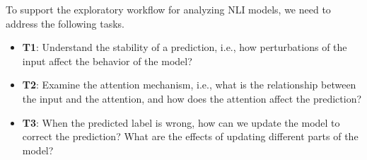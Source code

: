 %
To support the exploratory workflow for analyzing NLI models, we need to address the following tasks.

\begin{itemize}

\item \textbf{T1}: Understand the stability of a prediction, i.e., how perturbations of the input affect the behavior of the model?

\item \textbf{T2}: Examine the attention mechanism, i.e., what is the relationship between the input and the attention, and how does the attention affect the prediction?

\item \textbf{T3}: When the predicted label is wrong, how can we update the model to correct the prediction? What are the effects of updating different parts of the model?




\end{itemize}

